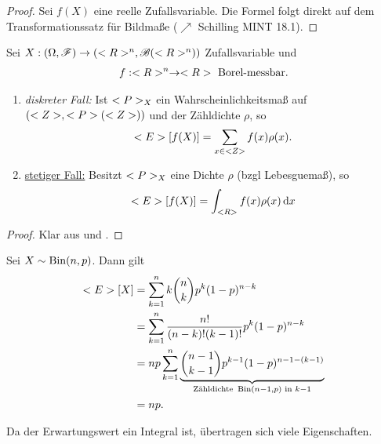 \begin{proof}
	Sei $f(X)$ eine reelle Zufallsvariable. Die Formel folgt direkt auf dem Transformationssatz für Bildmaße ($\nearrow$ Schilling MINT 18.1).
\end{proof}
\begin{proposition}
	Sei $X: (\O, \F) \to (\Rn, \borel(\Rn))$ Zufallsvariable und
	\begin{align*}
		f: \Rn \to \R \text{ Borel-messbar}.
	\end{align*}
	\begin{enumerate}
		\item \emph{diskreter Fall:} Ist $\P_X$ ein Wahrscheinlichkeitsmaß auf $(\Z, \P(\Z))$ und der Zähldichte $\rho$, so
		\begin{align*}
			\E[f(X)] = \sum_{x \in \Z} f(x)\rho(x).
		\end{align*}
		\item \ul{stetiger Fall:} Besitzt $\P_X$ eine Dichte $\rho$ (bzgl Lebesguemaß), so
		\begin{align*}
			\E[f(X)] = \int_{\R} f(x)\rho(x) \d x
		\end{align*}
	\end{enumerate}
\end{proposition}
\begin{proof}
	Klar aus  und . %
\end{proof}
\begin{example}
	Sei $X \sim \Bin(n,p)$. Dann gilt
	\begin{align*}
		\E[X] &= \sum_{k=1}^n k\binom{n}{k}p^k (1-p)^{n-k}\\
		&= \sum_{k=1}^n \frac{n!}{(n-k)!(k-1)!}p^k (1-p)^{n-k}\\
		&= np \sum_{k=1}^n \underbrace{\binom{n-1}{k-1}p^{k-1}(1-p)^{n-1-(k-1)}}_{\text{Zähldichte }\Bin(n-1,p) \text{ in } k-1}\\
		&= np.
	\end{align*}
\end{example}
Da der Erwartungswert ein Integral ist, übertragen sich viele Eigenschaften. 
